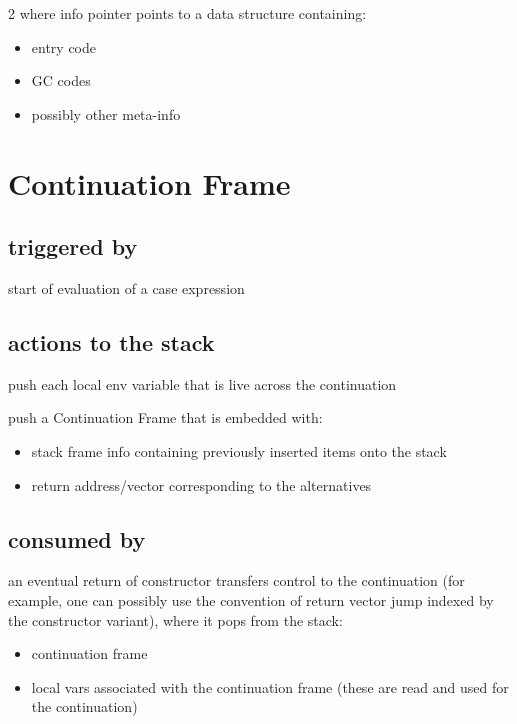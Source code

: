 \documentclass[8pt]{extarticle}
\begin{document}
\begin{multicols*}{2}
  where info pointer points to a data structure containing:
  \begin{itemize}
  \item entry code
  \item GC codes
  \item possibly other meta-info
  \end{itemize}
  
  \vfill\null
  \columnbreak

  \section{Continuation Frame}

  \subsection{triggered by}
  
  start of evaluation of a case expression

  \subsection{actions to the stack}

  push each local env variable that is live across the continuation

  push a Continuation Frame that is embedded with:

  \begin{itemize}
  \item stack frame info containing previously inserted items onto the stack
  \item return address/vector corresponding to the alternatives
  \end{itemize}
  
  \subsection{consumed by}

  an eventual return of constructor transfers control to the continuation (for example, one can possibly use the convention of return vector jump indexed by the constructor variant), where it pops from the stack:

  \begin{itemize}
  \item continuation frame
  \item local vars associated with the continuation frame (these are read and used for the continuation)
  \end{itemize}


\end{multicols*}
\end{document}
